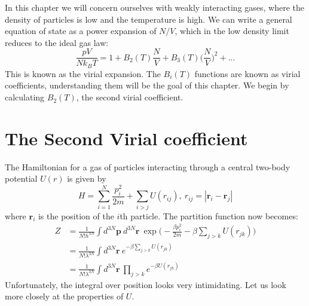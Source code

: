 \documentclass[a4paper,11pt,oneside]{book}
\begin{document}
In this chapter we will concern ourselves with weakly interacting gases, where the density of particles is low and the temperature is high. We can write a general equation of state as a power expansion of $N/V$, which in the low density limit reduces to the ideal gas law:
\begin{equation}\label{virial}
    \frac{pV}{Nk_B T} = 1+B_2(T) \frac{N}{V} +B_3(T) \bigg(\frac{N}{V}\bigg)^2+...
\end{equation}
This is known as the virial expansion. The $B_i(T)$ functions are known as virial coefficients, understanding them will be the goal of this chapter. We begin by calculating $B_2(T)$, the second virial coefficient.
\section{The Second Virial coefficient}
The Hamiltonian for a gas of particles interacting through a central two-body potential $U(r)$ is given by
\begin{equation}
    H = \sum_{i=1}^N \frac{p_i^2}{2m} + \sum_{i>j} U(r_{ij}), \ r_{ij} = |\textbf{r}_i-\textbf{r}_j|
\end{equation}
where $\textbf{r}_i$ is the position of the $i$th particle. The partition function now becomes:
\begin{align}
    Z &= \frac{1}{N! h^{3N}} \int  d^{3N}\textbf{p} \ d^{3N}\textbf{r} \ \exp\bigg(-\frac{\beta p_i^2}{2m} - \beta \sum_{j>k} U(r_{jk})\bigg)\\
    &=\frac{1}{N! \lambda^{3N}} \int d^{3N}\textbf{r} \ e^{-\beta \sum_{j>k} U(r_{jk})}\\
    &=\frac{1}{N! \lambda^{3N}} \int d^{3N}\textbf{r} \ \prod_{j>k} e^{-\beta U(r_{jk})}
\end{align}
Unfortunately, the integral over position looks very intimidating. Let us look more closely at the properties of $U$.
\end{document}
